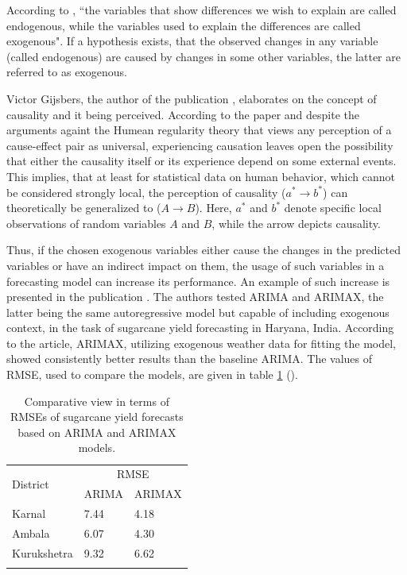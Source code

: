 \documentclass[3p,times,procedia]{elsarticle}
\begin{document}
According to \cite{smelser2001international}, ``the variables that show differences we wish to explain are called endogenous, while the variables used to explain the differences are  called exogenous". If a hypothesis exists, that the observed changes in any variable (called endogenous) are caused by changes in some other variables, the latter are referred to as exogenous.

Victor Gijsbers, the author of the publication \cite{gijsbers2021perceiving}, elaborates on the concept of causality and it being perceived. According to the paper and despite the arguments againt the Humean regularity theory that views any perception of a cause-effect pair as universal, experiencing causation leaves open the possibility that either the causality itself or its experience depend on some external events. This implies, that at least for statistical data on human behavior, which cannot be considered strongly local, the perception of causality ($a^* \to b^*$) can theoretically be generalized to ($A \to B$). Here, $a^*$ and $b^*$ denote specific local observations of random variables $A$ and $B$, while the arrow depicts causality.

Thus, if the chosen exogenous variables either cause the changes in the predicted variables or have an indirect impact on them, the usage of such variables in a forecasting model can increase its performance. An example of such increase is presented in the publication \cite{verma2022arima}. The authors tested ARIMA and ARIMAX, the latter being the same autoregressive model but capable of including exogenous context, in the task of sugarcane yield forecasting in Haryana, India. According to the article, ARIMAX, utilizing exogenous weather data for fitting the model, showed consistently better results than the baseline ARIMA. The values of RMSE, used to compare the models, are given in table \ref{tab:t4} (\cite{verma2022arima}).

\begin{table}[h]
\caption{Comparative view in terms of RMSEs of sugarcane yield forecasts based on ARIMA and ARIMAX models.}
\label{tab:t4}
\begin{tabular*}{\hsize}{@{\extracolsep{\fill}}lll@{}}
\toprule
\multirow{2}{*}{District} & \multicolumn{2}{c}{RMSE} \\
 & ARIMA & ARIMAX \\
\colrule
Karnal & 7.44 & 4.18 \\
Ambala & 6.07 & 4.30 \\
Kurukshetra & 9.32 & 6.62 \\
\botrule
\end{tabular*}
\end{table}
\end{document}
